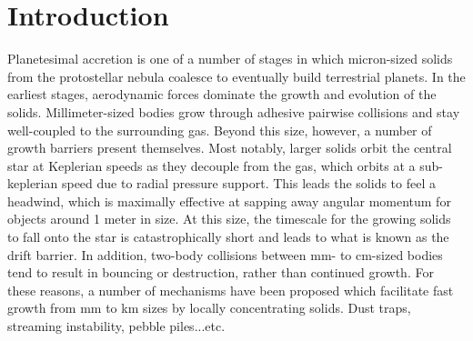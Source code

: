 \documentclass[onecolumn]{aastex63}
\begin{document}

\section{Introduction} \label{sec:intro}

Planetesimal accretion is one of a number of stages in which micron-sized solids from the protostellar nebula coalesce to eventually build terrestrial planets. In the earliest stages, aerodynamic forces dominate the growth and evolution of the solids. Millimeter-sized bodies grow through adhesive pairwise collisions and stay well-coupled to the surrounding gas. Beyond this size, however, a number of growth barriers present themselves. Most notably, larger solids orbit the central star at Keplerian speeds as they decouple from the gas, which orbits at a sub-keplerian speed due to radial pressure support. This leads the solids to feel a headwind, which is maximally effective at sapping away angular momentum for objects around 1 meter in size. At this size, the timescale for the growing solids to fall onto the star is catastrophically short and leads to what is known as the drift barrier. In addition, two-body collisions between mm- to cm-sized bodies tend to result in bouncing or destruction, rather than continued growth. For these reasons, a number of mechanisms have been proposed which facilitate fast growth from mm to km sizes by locally concentrating solids. Dust traps, streaming instability, pebble piles...etc.
\end{document}
